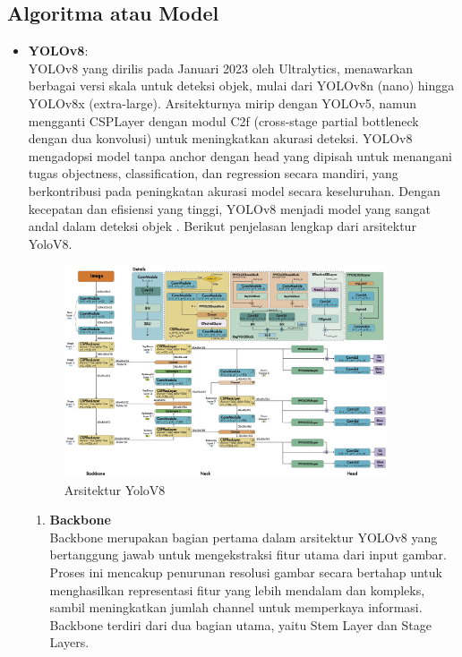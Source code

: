\documentclass[journal,article,submit,pdftex,moreauthors]{Definitions/mdpi}
\begin{document}
\subsection{Algoritma atau Model}
\begin{itemize}
    \item {\textbf{YOLOv8}}: \\
   \hspace*{2em}YOLOv8 yang dirilis pada Januari 2023 oleh Ultralytics, menawarkan berbagai versi skala untuk deteksi objek, mulai dari YOLOv8n (nano) hingga YOLOv8x (extra-large). Arsitekturnya mirip dengan YOLOv5, namun mengganti CSPLayer dengan modul C2f (cross-stage partial bottleneck dengan dua konvolusi) untuk meningkatkan akurasi deteksi. YOLOv8 mengadopsi model tanpa anchor dengan head yang dipisah untuk menangani tugas objectness, classification, dan regression secara mandiri, yang berkontribusi pada peningkatan akurasi model secara keseluruhan. Dengan kecepatan dan efisiensi yang tinggi, YOLOv8 menjadi model yang sangat andal dalam deteksi objek \cite{Terven2023}. Berikut penjelasan lengkap dari arsitektur YoloV8.
    \begin{figure}[H]
        \centering
        \includegraphics[width=0.9\textwidth]{Images/yolov8.png}
        \caption{\centering Arsitektur YoloV8 \cite{Terven2023}}
        \label{fig:activity-upload-gambar}
    \end{figure}
\begin{enumerate}
    \item \textbf{Backbone} \\
    \hspace*{2em}Backbone merupakan bagian pertama dalam arsitektur YOLOv8 yang bertanggung jawab untuk mengekstraksi fitur utama dari input gambar. Proses ini mencakup penurunan resolusi gambar secara bertahap untuk menghasilkan representasi fitur yang lebih mendalam dan kompleks, sambil meningkatkan jumlah channel untuk memperkaya informasi. Backbone terdiri dari dua bagian utama, yaitu Stem Layer dan Stage Layers.
    

\end{enumerate}
\end{itemize}
\end{document}
